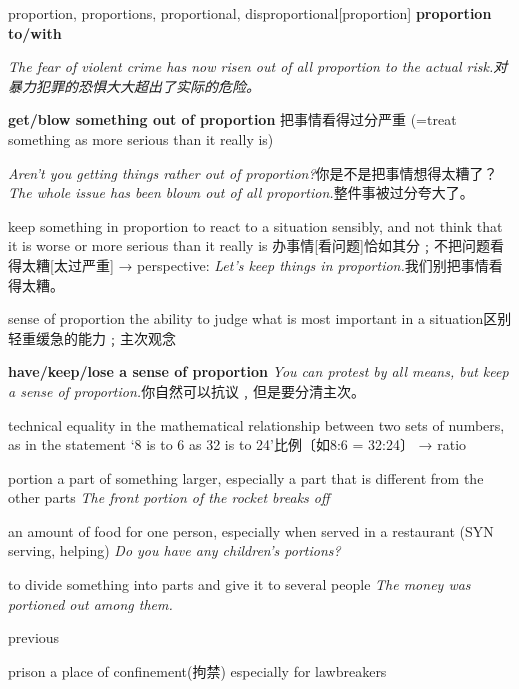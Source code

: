 \begin{DefWord}{proportion, proportions, proportional, disproportional}[proportion]
\textbf{proportion to/with}

\textit{The fear of violent crime has now risen out of all proportion to the actual risk.对暴力犯罪的恐惧大大超出了实际的危险。}

\textbf{get/blow something out of proportion} 把事情看得过分严重
(=treat something as more serious than it really is)

\textit{Aren’t you getting things rather out of proportion?}你是不是把事情想得太糟了？
\textit{The whole issue has been blown out of all proportion.}整件事被过分夸大了。

keep something in proportion to react to a situation sensibly, and not think that it is worse or more serious than it really is 办事情[看问题]恰如其分﹔不把问题看得太糟[太过严重] → perspective:
\textit{Let’s keep things in proportion.}我们别把事情看得太糟。

sense of proportion the ability to judge what is most important in a situation区别轻重缓急的能力﹔主次观念

\textbf{have/keep/lose a sense of proportion}
\textit{You can protest by all means, but keep a sense of proportion.}你自然可以抗议﹐但是要分清主次。

technical equality in the mathematical relationship between two sets of numbers, as in the statement ‘8 is to 6 as 32 is to 24’比例〔如8:6 = 32:24〕 → ratio


\end{DefWord}



\begin{DefWord}{portion}
    a part of something larger, especially a part that is different from the other parts
    \textit{The front portion of the rocket breaks off}

    an amount of food for one person, especially when served in a restaurant (SYN  serving, helping)
    \textit{Do you have any children’s portions?}

    to divide something into parts and give it to several people
    \textit{The money was portioned out among them.}
\end{DefWord}

\begin{DefWord}{previous}
\end{DefWord}

\begin{DefWord}{prison}
    a place of confinement(拘禁) especially for lawbreakers
\end{DefWord}

